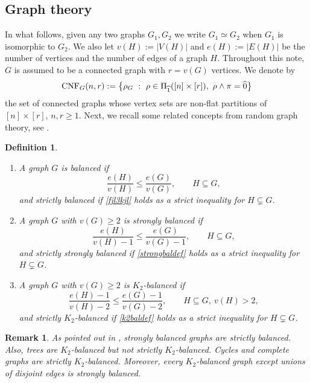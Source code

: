 \documentclass[12pt]{article}
\newtheorem{definition}[prop]{Definition}
\newtheorem{remark}[prop]{Remark}
\numberwithin{equation}{section}
\begin{document}
\subsection*{Graph theory}
\noindent
In what follows, given any two graphs $G_1,G_2$
we write $G_1\simeq G_2$ when $G_1$ is isomorphic to $G_2$. 
We also let $v(H):=|V(H)|$ and $e(H):=|E(H)|$ be the number of vertices and the number of edges of a graph $H$.
Throughout this note, $G$ is assumed to be a connected graph with $ r = v(G)$ vertices. %
We denote by 
$$
{\rm CNF}_G(n,r) :=\big\{ \rho_G \ : \ \rho\in\Pi_{\widehat{1}}( [n]\times [r]),
 \ 
 \rho\wedge\pi=\widehat{0}\big\}
$$
the set of connected graphs whose vertex sets are non-flat partitions of
 $[n]\times [r]$, $n, r\geq 1$. 
 Next, we recall some related concepts from random graph theory, see \cite{luczakrucinski92,JLR11}.  
\begin{definition} \cite[pages~64-65]{JLR11}
  \begin{enumerate}[1)]
    \item
    A graph $G$ is balanced if 
    \begin{equation}
 \label{fjl3kjl} 
\frac{e(H)}{v(H)}\le\frac{e(G)}{v(G)},
\qquad H\subseteq G, 
  \end{equation}
 and strictly balanced if \eqref{fjl3kjl} 
 holds as a strict inequality for $H\subsetneq G$. 
\item 
 A graph $G$ with $v(G)\ge2$ is strongly balanced %
 if 
\begin{equation}\label{strongbaldef}
  \frac{e(H)}{v(H)-1}\le\frac{e(G)}{v(G)-1},
  \qquad
  H\subseteq G, 
\end{equation}
and strictly strongly balanced if
\eqref{strongbaldef} holds as a strict inequality for
 $H\subsetneq G$. 
 \item 
 A graph $G$ with $v(G)\ge2$ is $K_2$-balanced
 if 
\begin{equation}\label{k2baldef}
  \frac{e(H)-1}{v(H)-2}\le\frac{e(G)-1}{v(G)-2},
  \qquad
  H\subseteq G,~ v(H)>2,
\end{equation}
and strictly $K_2$-balanced if
\eqref{k2baldef} holds as a strict inequality for
 $H\subsetneq G$. 
\end{enumerate}
\end{definition}
\begin{remark}\label{graph-example}
 As pointed out in \cite{luczakrucinski92}, strongly balanced graphs are strictly balanced. Also, trees are $K_2$-balanced but not strictly $K_2$-balanced. Cycles and complete graphs are strictly $K_2$-balanced. Moreover, every $K_2$-balanced graph except unions of disjoint edges is strongly balanced.
\end{remark}  
\end{document}
